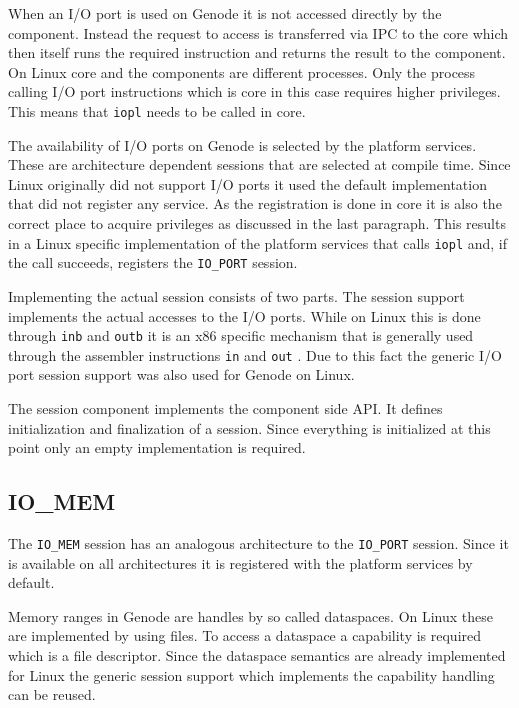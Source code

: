 \documentclass[
a4paper,
11pt,
twoside
]{report}
\begin{document}
		When an I/O port is used on Genode it is not accessed directly by the component.
		Instead the request to access is transferred via IPC to the core which then itself runs the required instruction and returns the result to the component.
		On Linux core and the components are different processes.
		Only the process calling I/O port instructions which is core in this case requires higher privileges.
		This means that \texttt{iopl} needs to be called in core.
		
		The availability of I/O ports on Genode is selected by the platform services.
		These are architecture dependent sessions that are selected at compile time.
		Since Linux originally did not support I/O ports it used the default implementation that did not register any service.
		As the registration is done in core it is also the correct place to acquire privileges as discussed in the last paragraph.
		This results in a Linux specific implementation of the platform services that calls \texttt{iopl} and, if the call succeeds, registers the \texttt{IO\_PORT} session.
		
		Implementing the actual session consists of two parts.
		The session support implements the actual accesses to the I/O ports.
		While on Linux this is done through \texttt{inb} and \texttt{outb} \citep{outb} it is an x86 specific mechanism that is generally used through the assembler instructions \texttt{in} and \texttt{out} \citep{intelmanual2}.
		Due to this fact the generic I/O port session support was also used for Genode on Linux.
		
		The session component implements the component side API.
		It defines initialization and finalization of a session.
		Since everything is initialized at this point only an empty implementation is required.
		
		\subsection{IO\_MEM}
		
		The \texttt{IO\_MEM} session has an analogous architecture to the \texttt{IO\_PORT} session.
		Since it is available on all architectures it is registered with the platform services by default.
		
		Memory ranges in Genode are handles by so called dataspaces.
		On Linux these are implemented by using files.
		To access a dataspace a capability is required which is a file descriptor.
		Since the dataspace semantics are already implemented for Linux the generic session support which implements the capability handling can be reused.
		
\end{document}
